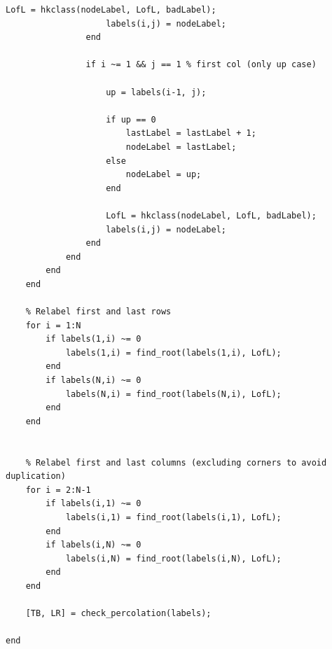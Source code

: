 \begin{lstlisting}[style=matlabstyle]
                    LofL = hkclass(nodeLabel, LofL, badLabel);
                    labels(i,j) = nodeLabel;
                end
                
                if i ~= 1 && j == 1 % first col (only up case)
    
                    up = labels(i-1, j);
    
                    if up == 0
                        lastLabel = lastLabel + 1;
                        nodeLabel = lastLabel;
                    else
                        nodeLabel = up;
                    end

                    LofL = hkclass(nodeLabel, LofL, badLabel);
                    labels(i,j) = nodeLabel;
                end
            end
        end
    end

    % Relabel first and last rows
    for i = 1:N
        if labels(1,i) ~= 0
            labels(1,i) = find_root(labels(1,i), LofL);
        end
        if labels(N,i) ~= 0
            labels(N,i) = find_root(labels(N,i), LofL);
        end
    end


    % Relabel first and last columns (excluding corners to avoid duplication)
    for i = 2:N-1
        if labels(i,1) ~= 0
            labels(i,1) = find_root(labels(i,1), LofL);
        end
        if labels(i,N) ~= 0
            labels(i,N) = find_root(labels(i,N), LofL);
        end
    end

    [TB, LR] = check_percolation(labels);

end
\end{lstlisting}

